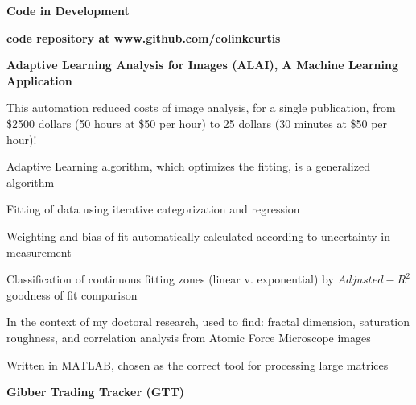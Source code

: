 \documentclass[letterpaper,final]{memoir}
\newcommand{\LargeSep}{\vspace{1.3em}}
\newcommand{\Sep}{\vspace{1.0em}}
\newcommand{\SmallSep}{\vspace{0.4em}}
\newcommand{\CVSection}[1]
	{\LARGE\textbf{#1}\par
	\SmallSep\normalsize}
\newcommand{\CVItem}[1]
	{\textbf{\color{Blue} #1}}
\begin{document}
\LargeSep



\notoserif \CVSection{Code in Development}

\normalfont

\Sep

\CVItem{code repository at www.github.com/colinkcurtis} 

\Sep

\CVItem{Adaptive Learning Analysis for Images (ALAI), A Machine Learning Application} 

\begin{compactitem}[\color{Blue}$\circ$]
   
    \SmallSep

    \item This automation reduced costs of image analysis, for a single publication, from \$2500 dollars (50 hours at \$50 per hour) to 25 dollars (30 minutes at \$50 per hour)!

    \item Adaptive Learning algorithm, which optimizes the fitting, is a generalized algorithm

    \item Fitting of data using iterative categorization and regression

    \item Weighting and bias of fit automatically calculated according to uncertainty in measurement

    \item Classification of continuous fitting zones (linear v. exponential) by $Adjusted-R^2$ goodness of fit comparison

    \item In the context of my doctoral research, used to find: fractal dimension, saturation roughness, and correlation analysis from Atomic Force Microscope images

    \item Written in MATLAB, chosen as the correct tool for processing large matrices
    

\end{compactitem}

\newpage

\CVItem{Gibber Trading Tracker (GTT)} 
\end{document}
